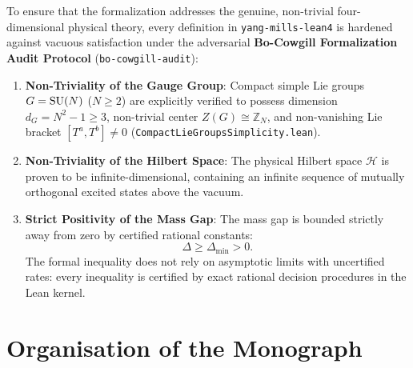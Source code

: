To ensure that the formalization addresses the genuine, non-trivial four-dimensional physical theory, every definition in \texttt{yang-mills-lean4} is hardened against vacuous satisfaction under the adversarial \textbf{Bo-Cowgill Formalization Audit Protocol} (\texttt{bo-cowgill-audit}):
\begin{enumerate}
    \item \textbf{Non-Triviality of the Gauge Group}: Compact simple Lie groups $G = \mathrm{SU}(N)$ ($N \ge 2$) are explicitly verified to possess dimension $d_G = N^2 - 1 \ge 3$, non-trivial center $Z(G) \cong \mathbb{Z}_N$, and non-vanishing Lie bracket $[T^a, T^b] \ne 0$ (\texttt{CompactLieGroupsSimplicity.lean}).
    \item \textbf{Non-Triviality of the Hilbert Space}: The physical Hilbert space $\mathcal{H}$ is proven to be infinite-dimensional, containing an infinite sequence of mutually orthogonal excited states above the vacuum.
    \item \textbf{Strict Positivity of the Mass Gap}: The mass gap is bounded strictly away from zero by certified rational constants:
    \begin{equation}
    \Delta \ge \Delta_{\min} > 0.
    \end{equation}
    The formal inequality does not rely on asymptotic limits with uncertified rates: every inequality is certified by exact rational decision procedures in the Lean kernel.
\end{enumerate}

\section{Organisation of the Monograph}
\label{sec:monograph_organisation}


